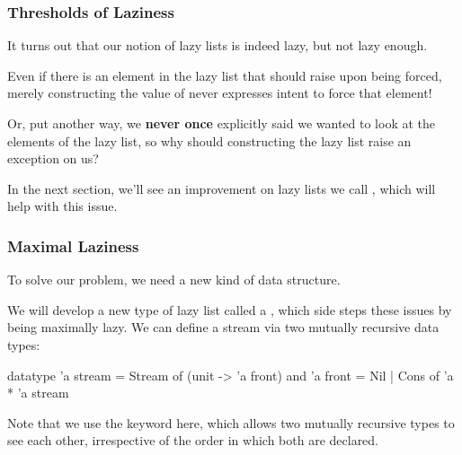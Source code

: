 \documentclass[aspectratio=169, handout]{beamer}
\begin{document}
\begin{frame}[fragile]
  \frametitle{Thresholds of Laziness}

  It turns out that our notion of lazy lists is indeed lazy, but not
  lazy enough.

  \pause
  \vspace{\fill}

  Even if there is an element in the lazy list that should raise 
  upon being forced, merely constructing the value of 
  never expresses intent to force that element!

  \pause
  \vspace{\fill}

  Or, put another way, we \textbf{never once} explicitly said
  we wanted to look at the elements of the lazy list, so why should constructing
  the lazy list raise an exception on us?

  \pause
  \vspace{\fill}

  In the next section, we'll see an improvement on lazy lists we call ,
  which will help with this issue.
\end{frame}


\begin{frame}[fragile]
  \frametitle{Maximal Laziness}

  To solve our problem, we need a new kind of data structure.

  \pause
  \vspace{\fill}


  \pause
  \vspace{\fill}

  We will develop a new type of lazy list called a , which side steps
  these issues by being maximally lazy. We can define a stream via two mutually
  recursive data types:

  \begin{codeblock}
    datatype 'a stream = Stream of (unit -> 'a front)
    and 'a front = Nil | Cons of 'a * 'a stream
  \end{codeblock}

  \pause
  \vspace{\fill}

  Note that we use the  keyword here, which allows two mutually recursive
  types to see each other, irrespective of the order in which both are declared.
\end{frame}
\end{document}
